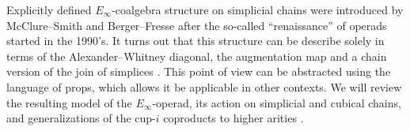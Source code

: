 Explicitly defined $E_\infty$-coalgebra structure on simplicial chains were introduced by McClure--Smith \cite{mcclure2003multivariable} and Berger--Fresse \cite{berger2004combinatorial} after the so-called ``renaissance'' of operads started in the 1990's.
It turns out that this structure can be describe solely in terms of the Alexander--Whitney diagonal, the augmentation map and a chain version of the join of simplices \cite{medina2020prop1}.
This point of view can be abstracted using the language of props, which allows it be applicable in other contexts.
We will review the resulting model of the $E_\infty$-operad, its action on simplicial and cubical chains, and generalizations of the cup-$i$ coproducts to higher arities \cite{medina2020maysteenrod}.